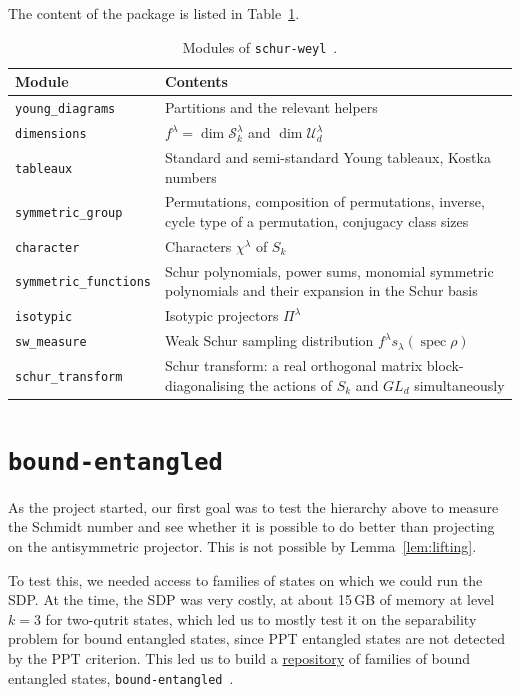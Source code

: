 \documentclass[11pt,a4paper]{report}
\DeclareMathOperator{\spec}{spec}
\begin{document}
The content of the package is listed in Table~\ref{tab:schurweyl}.
\begin{table}[h]
\centering\small\renewcommand{\arraystretch}{1.15}
\begin{tabular}{@{}lp{11.2cm}@{}}
\hline
Module & Contents \\
\hline
\texttt{young\_diagrams} & Partitions and the relevant helpers \\
\texttt{dimensions} & $f^\lambda=\dim\mathcal S^\lambda_k$ and $\dim\mathcal U^\lambda_d$ \\
\texttt{tableaux} & Standard and semi-standard Young tableaux, Kostka numbers\\
\texttt{symmetric\_group} & Permutations, composition of permutations, inverse, cycle type of a permutation, conjugacy class sizes \\
\texttt{character} & Characters $\chi^\lambda$ of $S_k$ \\
\texttt{symmetric\_functions} & Schur polynomials, power sums, monomial symmetric polynomials and their expansion in the Schur basis \\
\texttt{isotypic} & Isotypic projectors $\Pi^\lambda$ \\
\texttt{sw\_measure} & Weak Schur sampling distribution $f^\lambda s_\lambda(\spec\rho)$ \\
\texttt{schur\_transform} & Schur transform: a real orthogonal matrix block-diagonalising the actions of $S_k$ and $GL_d$ simultaneously \\
\hline
\end{tabular}
\caption{Modules of \texttt{schur-weyl}~\cite{schurWeyl}.}
\label{tab:schurweyl}
\end{table}

\section{\texttt{bound-entangled}}
As the project started, our first goal was to test the hierarchy above to measure the Schmidt number and see whether it is possible to do better than projecting on the antisymmetric projector. This is not possible by Lemma~\ref{lem:lifting}.

To test this, we needed access to families of states on which we could run the SDP. At the time, the SDP was very costly, at about 15\,GB of memory at level $k=3$ for two-qutrit states, which led us to mostly test it on the separability problem for bound entangled states, since PPT entangled states are not detected by the PPT criterion.
This led us to build a \href{https://github.com/AVlyx/bound-entangled}{repository} of families of bound entangled states, \texttt{bound-entangled}~\cite{boundEntangled}.
\end{document}

